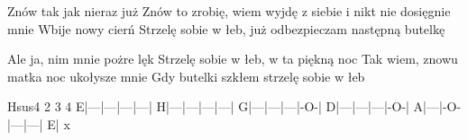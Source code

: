 \documentclass[../../../songbook.tex]{subfiles}
\begin{document}
\-\hspace{1cm} Znów tak jak nieraz już							 \newline
\-\hspace{1cm} Znów to zrobię, wiem wyjdę z siebie i nikt nie dosięgnie mnie							 \newline
\-\hspace{1cm} Wbije nowy cierń							 \newline
\-\hspace{1cm} Strzelę sobie w łeb, już odbezpieczam następną butelkę							 \newline

\-\hspace{1cm} Ale ja, nim mnie pożre lęk							 \newline
\-\hspace{1cm} Strzelę sobie w łeb, w ta piękną noc							 \newline
\-\hspace{1cm} Tak wiem, znowu matka noc ukołysze mnie							 \newline
\-\hspace{1cm} Gdy butelki szkłem strzelę sobie w łeb							 \newline

       Hsus4    2   3   4 \newline
 E|---|---|---|---| \newline
 H|---|---|---|---| \newline
 G|---|---|---|-O-| \newline
 D|---|---|---|-O-| \newline
 A|---|-O-|---|---| \newline
 E|     x 
\end{document}
